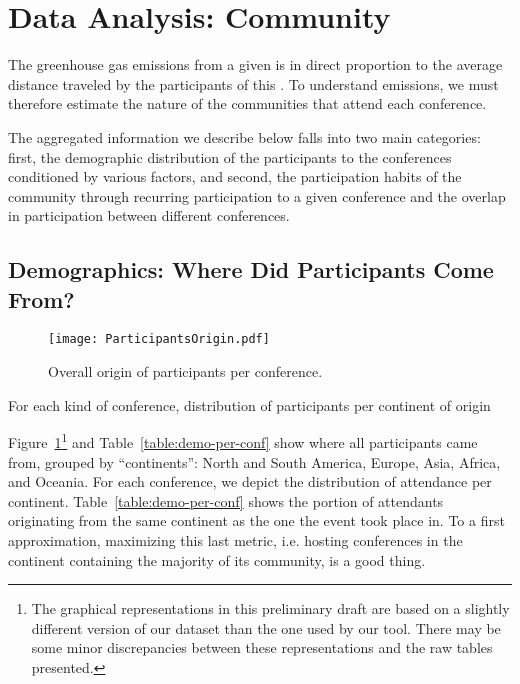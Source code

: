 \section{Data Analysis: Community}
\label{sec:community}

The greenhouse gas emissions from a given \event is in direct proportion to
the average distance traveled by the participants of this \event.
To understand emissions, we must therefore estimate the nature of the
communities that attend each conference.

The aggregated information we describe below falls into two main categories:
first, the demographic distribution of the participants to the conferences
conditioned by various factors, and second, the participation habits of the
community through recurring participation to a given conference and the
overlap in participation between different conferences.


\subsection{Demographics: Where Did Participants Come From?}
\label{subsec:demo}

\begin{figure}
  \centering
  \texttt{[image: ParticipantsOrigin.pdf]}
  \caption{Overall origin of participants per conference.}
  \label{fig:demo-per-conf}
\end{figure}

\begin{table}
\caption{For each kind of conference, distribution of participants per continent of origin}
\label{table:demo-per-conf}
\end{table}


Figure~\ref{fig:demo-per-conf}\footnote{The graphical representations in
  this preliminary draft are based on a slightly different version of our
  dataset than the one used by our tool. There may be some minor
  discrepancies between these representations and the raw tables
  presented.} and Table~\ref{table:demo-per-conf} show
where all participants came from, grouped by ``continents'': North and South
America, Europe, Asia, Africa, and Oceania. For each conference, we depict the
distribution of attendance per continent. Table~\ref{table:demo-per-conf}
shows the portion of attendants originating from the same continent as the
one the event took place in. To a first approximation, maximizing this last
metric, i.e. hosting conferences in the continent containing the majority of
its community, is a good thing.


